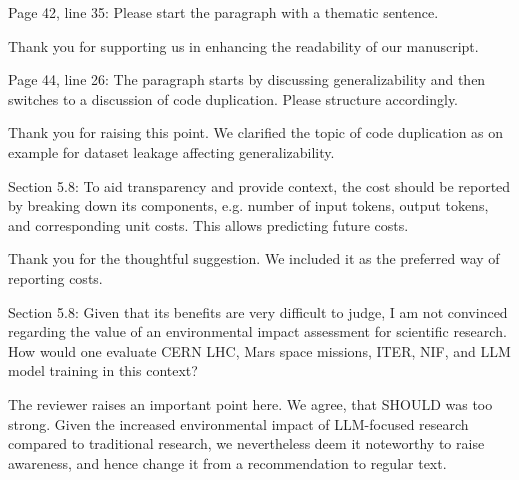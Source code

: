 \documentclass[12pt,english]{reviewresponse}
\begin{document}
\begin{revcomment}
Page 42, line 35: Please start the paragraph with a thematic sentence.
\end{revcomment}
\begin{revresponse}
    Thank you for supporting us in enhancing the readability of our manuscript.
\end{revresponse}

\begin{revcomment}
Page 44, line 26: The paragraph starts by discussing generalizability and then switches to a discussion of code duplication. Please structure accordingly.
\end{revcomment}
\begin{revresponse}
    Thank you for raising this point. We clarified the topic of code duplication as on example for dataset leakage affecting generalizability.
\end{revresponse}

\begin{revcomment}
Section 5.8: To aid transparency and provide context, the cost should be reported by breaking down its components, e.g. number of input tokens, output tokens, and corresponding unit costs. This allows predicting future costs.
\end{revcomment}
\begin{revresponse}
    Thank you for the thoughtful suggestion. We included it as the preferred way of reporting costs.
\end{revresponse}

\begin{revcomment}
Section 5.8: Given that its benefits are very difficult to judge, I am not convinced regarding the value of an environmental impact assessment for scientific research. How would one evaluate CERN LHC, Mars space missions, ITER, NIF, and LLM model training in this context?
\end{revcomment}
\begin{revresponse}
    The reviewer raises an important point here. We agree, that SHOULD was too strong. Given the increased environmental impact of LLM-focused research compared to traditional research, we nevertheless deem it noteworthy to raise awareness, and hence change it from a recommendation to regular text.
\end{revresponse}
\end{document}
